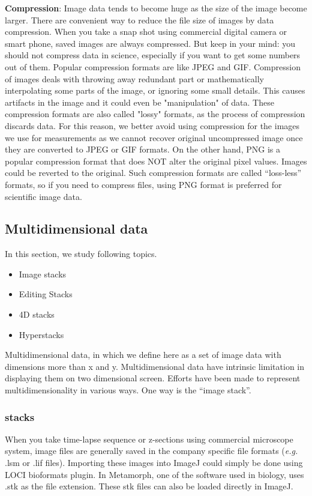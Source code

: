 \textbf{Compression}: Image data tends to become huge as the size of the image become larger. There are convenient way to reduce the file size of images by data compression. When you take a snap shot using commercial digital camera or smart phone, saved images are always compressed.  
But keep in your mind:
you should not compress data in science, especially if you want to get some numbers out of them.
Popular compression formats are like JPEG and GIF. Compression of images deals
with throwing away redundant part or mathematically interpolating some parts of
the image, or ignoring some small details. This causes artifacts in the image and it could even be
"manipulation" of data. These compression formats are also called "lossy" formats, as
the process of compression discards data.  For this reason, we better avoid using compression for the images we use
for measurements as we cannot recover original uncompressed image once they are converted to JPEG or GIF formats. On the other hand, PNG is a popular compression format that does NOT alter the original pixel values. Images could be reverted to the original. Such compression formats are called ``loss-less'' formats, so if you need to compress files, using PNG format is preferred for scientific image data.  


\subsection{Multidimensional data}
\label{sec:stackBasics}

In this section, we study following topics.

\begin{itemize}
    \item Image stacks
    \item Editing Stacks
    \item 4D stacks
	\item Hyperstacks
\end{itemize}

Multidimensional data, in which we define here as a set of image data with dimensions more than x and y. Multidimensional data have intrinsic limitation in displaying them on two dimensional screen. Efforts have been made to represent multidimensionality in various ways. One way is the ``image stack''.

\subsubsection{stacks}
When you take time-lapse sequence or z-sections using commercial microscope system, image files are generally saved in the company specific file formats (\textit{e.g.} .lsm or .lif files). Importing these images into ImageJ could simply be done using LOCI bioformats plugin. In Metamorph, one of the software used in biology, uses .stk as the file extension. These stk files can also be loaded directly in ImageJ. 

